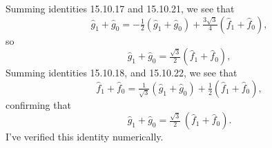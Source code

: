\documentclass{article}
\theoremstyle{definition}
\theoremstyle{plain}
\begin{document}
Summing identities 15.10.17 and 15.10.21, we see that
\[ \hat{g}_1 + \hat{g}_0 = -\tfrac{1}{2}(\hat{g}_1 + \hat{g}_0) + \tfrac{3\sqrt{3}}{4}(\hat{f}_1 + \hat{f}_0), \]
so
\[ \hat{g}_1 + \hat{g}_0 = \tfrac{\sqrt{3}}{2}(\hat{f}_1 + \hat{f}_0), \]
Summing identities 15.10.18, and 15.10.22, we see that
\[ \hat{f}_1 + \hat{f}_0 = \tfrac{1}{\sqrt{3}}(\hat{g}_1 + \hat{g}_0) + \tfrac{1}{2}(\hat{f}_1 + \hat{f}_0), \]
confirming that
\[ \hat{g}_1 + \hat{g}_0 = \tfrac{\sqrt{3}}{2}\,(\hat{f}_1 + \hat{f}_0). \]
I've verified this identity numerically.
\end{document}
